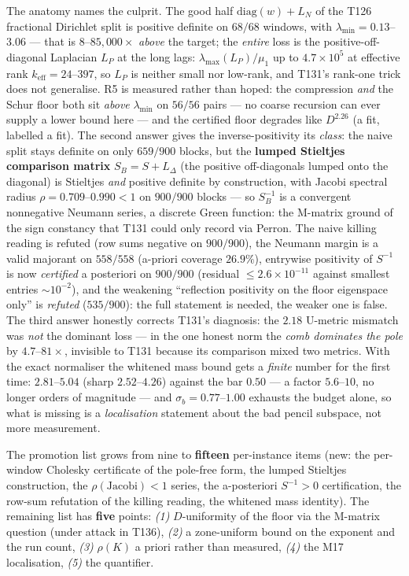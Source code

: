 \documentclass[11pt,a4paper]{article}
\begin{document}
\noindent The anatomy names the culprit. The good half $\mathrm{diag}(w)+L_N$ of the T126
fractional Dirichlet split is positive definite on $68/68$ windows, with
$\lambda_{\min}=0.13$--$3.06$ --- that is $8$--$85{,}000\times$ \emph{above} the target;
the \emph{entire} loss is the positive-off-diagonal Laplacian $L_P$ at the long lags:
$\lambda_{\max}(L_P)/\mu_{1}$ up to $4.7\times10^{5}$ at effective rank
$k_{\mathrm{eff}}=24$--$397$, so $L_P$ is neither small nor low-rank, and T131's rank-one
trick does not generalise. R5 is measured rather than hoped: the compression \emph{and}
the Schur floor both sit \emph{above} $\lambda_{\min}$ on $56/56$ pairs --- no coarse
recursion can ever supply a lower bound here --- and the certified floor degrades like
$D^{2.26}$ (a fit, labelled a fit). The second answer gives the inverse-positivity its
\emph{class}: the naive split stays definite on only $659/900$ blocks, but the
\textbf{lumped Stieltjes comparison matrix} $S_B=S+L_\Delta$ (the positive off-diagonals
lumped onto the diagonal) is Stieltjes \emph{and} positive definite by construction, with
Jacobi spectral radius $\rho=0.709$--$0.990<1$ on $900/900$ blocks --- so $S_B^{-1}$ is a
convergent nonnegative Neumann series, a discrete Green function: the M-matrix ground of
the sign constancy that T131 could only record via Perron. The naive killing reading is
refuted (row sums negative on $900/900$), the Neumann margin is a valid majorant on
$558/558$ (a-priori coverage $26.9\%$), entrywise positivity of $S^{-1}$ is now
\emph{certified} a posteriori on $900/900$ (residual $\le2.6\times10^{-11}$ against
smallest entries $\sim10^{-2}$), and the weakening ``reflection positivity on the floor
eigenspace only'' is \emph{refuted} ($535/900$): the full statement is needed, the weaker
one is false. The third answer honestly corrects T131's diagnosis: the $2.18$ U-metric
mismatch was \emph{not} the dominant loss --- in the one honest norm the \emph{comb
dominates the pole} by $4.7$--$81\times$, invisible to T131 because its comparison mixed
two metrics. With the exact normaliser the whitened mass bound gets a \emph{finite} number
for the first time: $2.81$--$5.04$ (sharp $2.52$--$4.26$) against the bar $0.50$ --- a
factor $5.6$--$10$, no longer orders of magnitude --- and $\sigma_b=0.77$--$1.00$ exhausts
the budget alone, so what is missing is a \emph{localisation} statement about the bad
pencil subspace, not more measurement.

\begin{keybox}
The promotion list grows from nine to \textbf{fifteen} per-instance items (new: the
per-window Cholesky certificate of the pole-free form, the lumped Stieltjes construction,
the $\rho(\mathrm{Jacobi})<1$ series, the a-posteriori $S^{-1}>0$ certification, the
row-sum refutation of the killing reading, the whitened mass identity). The remaining list
has \textbf{five} points: \emph{(1)} $D$-uniformity of the floor via the M-matrix question
(under attack in T136), \emph{(2)} a zone-uniform bound on the exponent and the run count,
\emph{(3)} $\rho(K)$ a priori rather than measured, \emph{(4)} the M17 localisation,
\emph{(5)} the quantifier.
\end{keybox}
\end{document}
